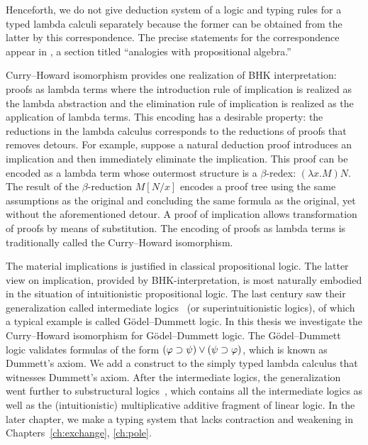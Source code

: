  Henceforth, we do not give deduction system of a logic and
 typing rules for a typed lambda calculi separately because
 the former can be obtained from the latter by this correspondence.
The
precise statements for the correspondence appear in
\citet[9E]{curry1974combinatory}, a section titled ``analogies with
propositional algebra.''

Curry--Howard isomorphism provides
one realization of BHK interpretation: proofs as lambda terms where the
introduction rule of implication is realized as the lambda abstraction
and the elimination rule of implication is realized as the application
of lambda terms.
This encoding has a desirable property:
the reductions in the lambda calculus corresponds to the reductions of
proofs that
removes detours.
For example, suppose a natural deduction proof introduces an implication and then
immediately eliminate the
implication.  This proof can be encoded as a lambda term whose outermost
structure is a $\beta$-redex: $(\lambda x. M)N$.
 The result of the $\beta$-reduction $M[N/x]$ encodes a proof tree using
 the same assumptions as the original and concluding the same formula as
 the original, yet without the aforementioned detour.
 A proof of implication allows transformation of proofs
by means of
substitution.  The encoding of proofs as lambda terms is traditionally
called the Curry--Howard isomorphism.

The material implications is justified in classical propositional logic.
The latter view on implication, provided by BHK-interpretation, is most
naturally embodied in the situation of
intuitionistic propositional logic.  The last century saw their
generalization called intermediate logics~\citep{umezawa} (or superintuitionistic
logics), of which a typical example is
called G\"odel--Dummett logic.
In this thesis we investigate the Curry--Howard isomorphism for
G\"odel--Dummett logic.  The G\"odel--Dummett
logic validates formulas
of the form $(\varphi\supset\psi)\lor(\psi\supset\varphi)$, which is known as
Dummett's axiom.  We add a construct to the simply typed lambda
calculus
that witnesses Dummett's axiom.
After the intermediate logics, the generalization went further to
substructural
logics~\citep{residuated}, which contains all the intermediate logics as
well as the
(intuitionistic) multiplicative
additive fragment of linear logic.
In the later chapter, we make a typing system that lacks contraction and
weakening in Chapters~\ref{ch:exchange}, \ref{ch:pole}.

